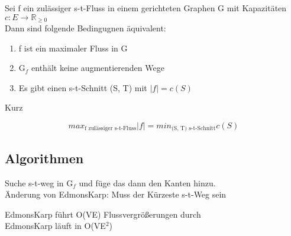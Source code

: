 \documentclass[14pt]{article}
\begin{document}
            \begin{definition}
                Sei f ein zulässiger s-t-Fluss in einem gerichteten Graphen 
                G mit Kapazitäten $c : E \rightarrow \mathbb{R}_{\geq 0}$ \\
                Dann sind folgende Bedingugnen äquivalent:
                \begin{enumerate}
                    \item f ist ein maximaler Fluss in G
                    \item G$_f$ enthält keine augmentierenden Wege
                    \item Es gibt einen s-t-Schnitt (S, T) mit $|f| = c(S)$
                \end{enumerate}
                Kurz \\
                \begin{centering}
                    \[
                        max_{\text{f zulässiger s-t-Fluss}} |f| 
                        = min_{\text{(S, T) s-t-Schnitt}} c(S)
                    \]
                \end{centering}
            \end{definition}

        \subsection{Algorithmen}
            \begin{definition}
                Suche s-t-weg in G$_f$ und füge das dann den 
                Kanten hinzu. \\
                Änderung von EdmonsKarp: Muss der Kürzeste s-t-Weg sein
            \end{definition}
            EdmonsKarp führt O(VE) Flussvergrößerungen durch \\
            EdmonsKarp läuft in O(VE$^2$)
\end{document}
